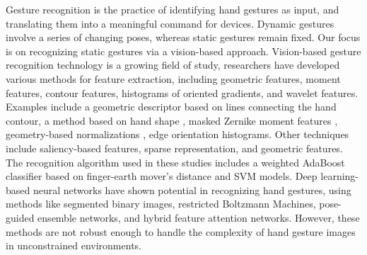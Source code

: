Gesture recognition is the practice of identifying hand gestures as input, and translating them into a meaningful command for devices. Dynamic gestures involve a series of changing poses, whereas static gestures remain fixed. Our focus is on recognizing static gestures via a vision-based approach. Vision-based gesture recognition technology is a growing field of study, researchers have developed various methods for feature extraction, including geometric features, moment features, contour features, histograms of oriented gradients, and wavelet features. Examples include a geometric descriptor based on lines connecting the hand contour\cite{lopez2019gesture}, a method based on hand shape \cite{article}, masked Zernike moment features \cite{park2014hand}, geometry-based normalizations \cite{priyal2013robust}, edge orientation histograms. Other techniques include saliency-based features, sparse representation, and geometric features. The recognition algorithm used in these studies includes a weighted AdaBoost classifier based on finger-earth mover's distance and SVM models. Deep learning-based neural networks have shown potential in recognizing hand gestures, using methods like segmented binary images, restricted Boltzmann Machines, pose-guided ensemble networks, and hybrid feature attention networks. However, these methods are not robust enough to handle the complexity of hand gesture images in unconstrained environments.


\fi


